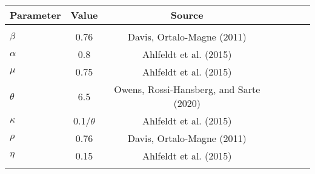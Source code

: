 \begin{tabular}{lcccccc} \hline
Parameter & Value & Source\\ \hline
 &  &  &    \\
 $\beta$ & 0.76 & Davis, Ortalo-Magne (2011) \\
 $\alpha$ & 0.8 & Ahlfeldt et al. (2015) \\
 $\mu$ & 0.75 & Ahlfeldt et al. (2015) \\
 $\theta$ & 6.5 & Owens, Rossi-Hansberg, and Sarte (2020)  \\
 $\kappa$ & 0.1/$\theta$ & Ahlfeldt et al. (2015) \\
 $\rho$ & 0.76 &  Davis, Ortalo-Magne (2011) \\
 $\eta$ & 0.15 & Ahlfeldt et al. (2015) \\
 &  &  &    \\
 \hline

\end{tabular}
